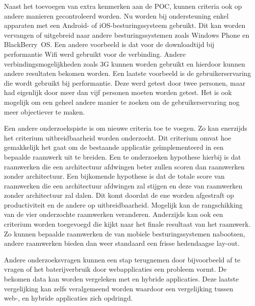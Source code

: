 Naast het toevoegen van extra kenmerken aan de POC, kunnen criteria ook op andere manieren gecontroleerd worden.
Nu worden bij ondersteuning enkel apparaten met een Android- of iOS-besturingssysteem gebruikt.
Dit kan worden vervangen of uitgebreid naar andere besturingssystemen zoals Windows Phone en BlackBerry~OS.
Een andere voorbeeld is dat voor de downloadtijd bij performantie Wifi werd gebruikt voor de verbinding.
Andere verbindingsmogelijkheden zoals 3G kunnen worden gebruikt en hierdoor kunnen andere resultaten bekomen worden.
Een laatste voorbeeld is de gebruikerservaring die wordt gebruikt bij performantie.
Deze werd getest door twee personen, maar had eigenlijk door meer dan vijf personen moeten worden getest.
Het is ook mogelijk om een geheel andere manier te zoeken om de gebruikerservaring nog meer objectiever te maken.

Een andere onderzoekspiste is om nieuwe criteria toe te voegen.
Zo kan enerzijds het criterium uitbreidbaarheid worden onderzocht.
Dit criterium omvat hoe gemakkelijk het gaat om de bestaande applicatie geïmplementeerd in een bepaalde raamwerk uit te breiden.
Een te onderzoeken hypothese hierbij is dat raamwerken die een architectuur afdwingen beter zullen scoren dan raamwerken zonder architectuur.
Een bijkomende hypothese is dat de totale score van raamwerken die een architectuur afdwingen zal stijgen en deze van raamwerken zonder architectuur zal dalen.
Dit komt doordat de ene worden afgestraft op productiviteit en de andere op uitbreidbaarheid.
Mogelijk kan de rangschikking van de vier onderzochte raamwerken veranderen.
Anderzijds kan ook een criterium worden toegevoegd die kijkt naar het finale resultaat van het raamwerk.
Zo kunnen bepaalde raamwerken de  van mobiele besturingssystemen  nabootsen, andere raamwerken bieden dan weer standaard een frisse hedendaagse lay-out.

Andere onderzoeksvragen kunnen een stap terugnemen door bijvoorbeeld af te vragen of het baterijverbruik door webapplicaties een probleem vormt.
De bekomen data kan worden vergeleken met  en hybride applicaties.
Deze laatste vergelijking kan zelfs veralgemeend worden waardoor een vergelijking tussen web-,  en hybride applicaties zich opdringd. 


